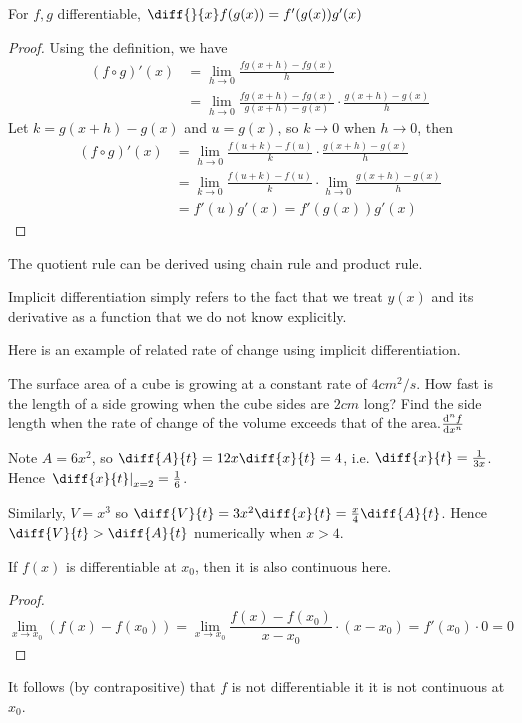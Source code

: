 \documentclass[11pt]{article}
\begin{document}
\begin{proposition}
  For \(f,g\) differentiable, \(\diff{}{x}f(g(x))=f'(g(x))g'(x)\)
\end{proposition}
\begin{proof}
  Using the definition, we have
  \begin{align*}
    (f\circ g)'(x) &= \lim_{h\to 0}\frac{fg(x+h)- fg(x)}{h} \\
    &= \lim_{h\to 0}\frac{fg(x+h)-fg(x)}{g(x+h)-g(x)}\cdot \frac{g(x+h)-g(x)}{h}
  \end{align*}
  Let \(k=g(x+h)-g(x)\) and \(u=g(x)\), so \(k \to 0\) when \(h \to 0\), then
  \begin{align*}
    (f\circ g)'(x) &= \lim_{h\to 0}\frac{f(u+k)-f(u)}{k}\cdot \frac{g(x+h)-g(x)}{h}\\
    &= \lim_{k\to 0}\frac{f(u+k)-f(u)}{k}\cdot \lim_{h\to 0}\frac{g(x+h)-g(x)}{h} \\
    &= f'(u)g'(x) = f'(g(x))g'(x)
  \end{align*}
\end{proof}
The quotient rule can be derived using chain rule and product rule.

Implicit differentiation simply refers to the fact that we treat \(y(x)\) and its derivative as a function that we do not know explicitly.

Here is an example of related rate of change using implicit differentiation.
\begin{example}
  The surface area of a cube is growing at a constant rate of \(4cm^2/s\). How fast is the
  length of a side growing when the cube sides are \(2cm\) long? Find the side length when
  the rate of change of the volume exceeds that of the area.\(\dv[n]{f}{x}\)
\end{example}
\begin{solution}
  Note \(A=6x^2\), so \(\diff{A}{t}=12x\diff{x}{t}=4\), i.e. \(\diff{x}{t}=\frac{1}{3x}\). Hence \(\left.\diff{x}{t}\right\rvert_{x=2}=\frac{1}{6}\).

  Similarly, \(V=x^3\) so \(\diff{V}{t}=3x^2\diff{x}{t}=\frac{x}{4}\diff{A}{t}\). Hence \(\diff{V}{t}>\diff{A}{t}\) numerically when \(x>4\).
\end{solution}

\begin{proposition}
  If \(f(x)\) is differentiable at \(x_0\), then it is also continuous here.
\end{proposition}
\begin{proof}
  \begin{equation*}
    \lim_{x\to x_0}(f(x)-f(x_0)) = \lim_{x\to x_0}\frac{f(x)-f(x_0)}{x-x_0}\cdot (x-x_0) = f'(x_0)\cdot 0 = 0
  \end{equation*}
\end{proof}
It follows (by contrapositive) that \(f\) is not differentiable it it is not continuous at \(x_0\).
\end{document}
